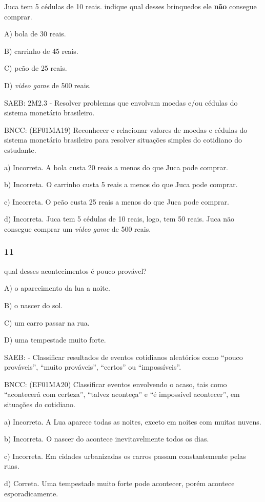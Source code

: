 Juca tem 5 cédulas de 10 reais. indique qual desses brinquedos ele
\textbf{não} consegue comprar.

A) bola de 30 reais.

B) carrinho de 45 reais.

C) peão de 25 reais.

D) \emph{video game} de 500 reais.

SAEB: 2M2.3 - Resolver problemas que envolvam moedas e/ou cédulas do
sistema monetário brasileiro.

BNCC: (EF01MA19) Reconhecer e relacionar valores de moedas e cédulas do
sistema monetário brasileiro para resolver situações simples do
cotidiano do estudante.

a) Incorreta. A bola custa 20 reais a menos do que Juca pode comprar.

b) Incorreta. O carrinho custa 5 reais a menos do que Juca pode comprar.

c) Incorreta. O peão custa 25 reais a menos do que Juca pode comprar.

d) Incorreta. Juca tem 5 cédulas de 10 reais, logo, tem 50 reais. Juca
não consegue comprar um \emph{vídeo game} de 500 reais.

\subsubsection{11}\label{section-112}

qual desses acontecimentos é pouco provável?

A) o aparecimento da lua a noite.

B) o nascer do sol.

C) um carro passar na rua.

D) uma tempestade muito forte.

SAEB: - Classificar resultados de eventos cotidianos aleatórios como
``pouco prováveis'', ``muito prováveis'', ``certos'' ou ``impossíveis''.

BNCC: (EF01MA20) Classificar eventos envolvendo o acaso, tais como
``acontecerá com certeza'', ``talvez aconteça'' e ``é impossível
acontecer'', em situações do cotidiano.

a) Incorreta. A Lua aparece todas as noites, exceto em noites com muitas
nuvens.

b) Incorreta. O nascer do acontece inevitavelmente todos os dias.

c) Incorreta. Em cidades urbanizadas os carros passam constantemente
pelas ruas.

d) Correta. Uma tempestade muito forte pode acontecer, porém acontece
esporadicamente.

